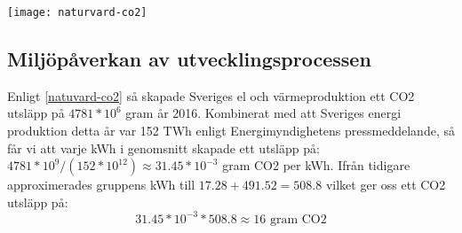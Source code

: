 \begin{figure*}[h]
	\texttt{[image: naturvard-co2]}
	\caption{Statistik ifrån naturvårdsverket}
	\label{natuvard-co2}
\end{figure*}


\subsection{Miljöpåverkan av utvecklingsprocessen}
Enligt \ref{natuvard-co2} så skapade Sveriges el och värmeproduktion ett CO2 utsläpp på $4781*10^6$ gram år 2016. Kombinerat med att Sveriges energi produktion detta år var 152 TWh enligt Energimyndighetens pressmeddelande\cite{elprod2016}, så får vi att varje kWh i genomsnitt skapade ett utsläpp på: $4781*10^9 / (152 * 10^{12}) \approx 31.45 * 10^{-3}$ gram CO2 per kWh. Ifrån tidigare approximerades gruppens kWh till $17.28 + 491.52 = 508.8$ vilket ger oss ett CO2 utsläpp på: $$31.45 * 10^{-3} * 508.8 \approx 16 \text{ gram CO2}$$
